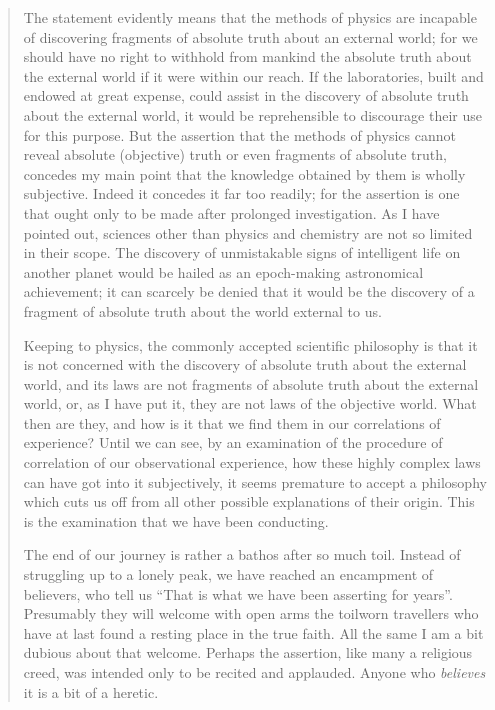 \begin{quote}
    The statement evidently means that the methods of physics are incapable of discovering fragments of absolute truth about an external world; for we should have no right to withhold from mankind the absolute truth about the external world if it were within our reach.  If the laboratories, built and endowed at great expense, could assist in the discovery of absolute truth about the external world, it would be reprehensible to discourage their use for this purpose.  But the assertion that the methods of physics cannot reveal absolute (objective) truth or even fragments of absolute truth, concedes my main point that the knowledge obtained by them is wholly subjective.  Indeed it concedes it far too readily; for the assertion is one that ought only to be made after prolonged investigation.  As I have pointed out, sciences other than physics and chemistry are not so limited in their scope.  The discovery of unmistakable signs of intelligent life on another planet would be hailed as an epoch-making astronomical achievement; it can scarcely be denied that it would be the discovery of a fragment of absolute truth about the world external to us.

    Keeping to physics, the commonly accepted scientific philosophy is that it is not concerned with the discovery of absolute truth about the external world, and its laws are not fragments of absolute truth about the external world, or, as I have put it, they are not laws of the objective world.  What then are they, and how is it that we find them in our correlations of experience?  Until we can see, by an examination of the procedure of correlation of our observational experience, how these highly complex laws can have got into it subjectively, it seems premature to accept a philosophy which cuts us off from all other possible explanations of their origin.  This is the examination that we have been conducting.

    The end of our journey is rather a bathos after so much toil.  Instead of struggling up to a lonely peak, we have reached an encampment of believers, who tell us ``That is what we have been asserting for years''.  Presumably they will welcome with open arms the toilworn travellers who have at last found a resting place in the true faith.  All the same I am a bit dubious about that welcome.  Perhaps the assertion, like many a religious creed, was intended only to be recited and applauded.  Anyone who \emph{believes} it is a bit of a heretic.  \citep[p. 184-186]{Eddington1939}

    
\end{quote}

